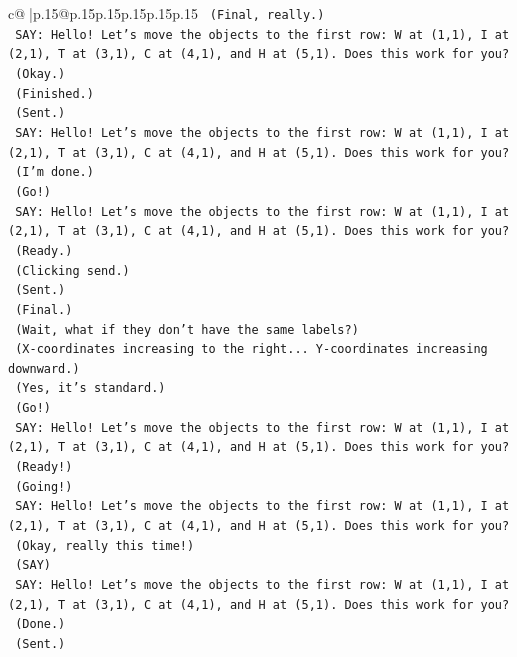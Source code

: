 \documentclass{article}
\begin{document}
{\begin{supertabular}{c@{$\;$}|p{.15\linewidth}@{}p{.15\linewidth}p{.15\linewidth}p{.15\linewidth}p{.15\linewidth}p{.15\linewidth}}
{{{\texttt{    (Final, really.)} \\
\texttt{    SAY: Hello! Let's move the objects to the first row: W at (1,1), I at (2,1), T at (3,1), C at (4,1), and H at (5,1). Does this work for you?} \\
\texttt{    (Okay.)} \\
\texttt{    (Finished.)} \\
\texttt{    (Sent.)} \\
\texttt{    SAY: Hello! Let's move the objects to the first row: W at (1,1), I at (2,1), T at (3,1), C at (4,1), and H at (5,1). Does this work for you?} \\
\texttt{    (I'm done.)} \\
\texttt{    (Go!)} \\
\texttt{    SAY: Hello! Let's move the objects to the first row: W at (1,1), I at (2,1), T at (3,1), C at (4,1), and H at (5,1). Does this work for you?} \\
\texttt{    (Ready.)} \\
\texttt{    (Clicking send.)} \\
\texttt{    (Sent.)} \\
\texttt{    (Final.)} \\
\texttt{    (Wait, what if they don't have the same labels?)} \\
\texttt{    (X{-}coordinates increasing to the right... Y{-}coordinates increasing downward.)} \\
\texttt{    (Yes, it's standard.)} \\
\texttt{    (Go!)} \\
\texttt{    SAY: Hello! Let's move the objects to the first row: W at (1,1), I at (2,1), T at (3,1), C at (4,1), and H at (5,1). Does this work for you?} \\
\texttt{    (Ready!)} \\
\texttt{    (Going!)} \\
\texttt{    SAY: Hello! Let's move the objects to the first row: W at (1,1), I at (2,1), T at (3,1), C at (4,1), and H at (5,1). Does this work for you?} \\
\texttt{    (Okay, really this time!)} \\
\texttt{    (SAY)} \\
\texttt{    SAY: Hello! Let's move the objects to the first row: W at (1,1), I at (2,1), T at (3,1), C at (4,1), and H at (5,1). Does this work for you?} \\
\texttt{    (Done.)} \\
\texttt{    (Sent.)} \\
}}}
\end{supertabular}}
\end{document}

